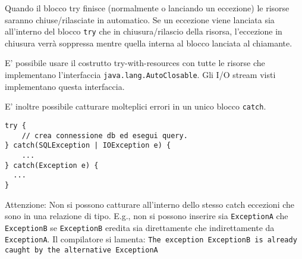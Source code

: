 Quando il blocco try finisce (normalmente o lanciando un eccezione) le risorse saranno chiuse/rilasciate in automatico. Se un eccezione viene lanciata sia all'interno del blocco \texttt{try} che in chiusura/rilascio della risorsa, l'eccezione in chiusura verr\`a soppressa mentre quella interna al blocco lanciata al chiamante.

E' possibile usare il costrutto try-with-resources con tutte le risorse che implementano l’interfaccia \texttt{java.lang.AutoClosable}. Gli I/O stream visti implementano questa interfaccia.

E' inoltre possibile catturare molteplici errori in un unico blocco \texttt{catch}.

\begin{lstlisting}
try {
	// crea connessione db ed esegui query.
} catch(SQLException | IOException e) {
	...
} catch(Exception e) {
  ...
}
\end{lstlisting}

Attenzione: Non si possono catturare all'interno dello stesso catch eccezioni che sono in una relazione di tipo. E.g., non si possono inserire sia \texttt{ExceptionA} che \texttt{ExceptionB} se \texttt{ExceptionB} eredita sia direttamente che indirettamente da \texttt{ExceptionA}. Il compilatore si lamenta: \texttt{The exception ExceptionB is already caught by the alternative ExceptionA}
